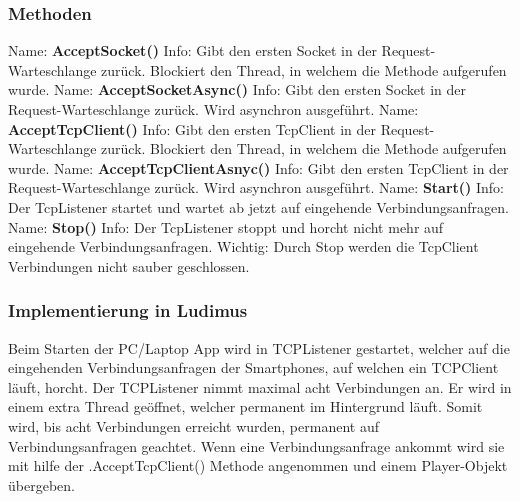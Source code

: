 \subsubsection{Methoden}
Name: \textbf{AcceptSocket()}
\newline
Info: Gibt den ersten Socket in der Request-Warteschlange zurück. Blockiert den Thread, in welchem die Methode aufgerufen wurde.
\newline \newline
Name: \textbf{AcceptSocketAsync()}
\newline
Info: Gibt den ersten Socket in der Request-Warteschlange zurück. Wird asynchron ausgeführt.
\newline \newline
Name: \textbf{AcceptTcpClient()}
\newline
Info: Gibt den ersten TcpClient in der Request-Warteschlange zurück. Blockiert den Thread, in welchem die Methode aufgerufen wurde.
\newline \newline
Name: \textbf{AcceptTcpClientAsnyc()}
\newline
Info: Gibt den ersten TcpClient in der Request-Warteschlange zurück. Wird asynchron ausgeführt.
\newline \newline
Name: \textbf{Start()}
\newline
Info: Der TcpListener startet und wartet ab jetzt auf eingehende Verbindungsanfragen.
\newline \newline
Name: \textbf{Stop()}
\newline
Info: Der TcpListener stoppt und horcht nicht mehr auf eingehende Verbindungsanfragen. Wichtig: Durch Stop werden die TcpClient Verbindungen nicht sauber geschlossen.
\newline \newline
\subsubsection{Implementierung in Ludimus}
Beim Starten der PC/Laptop App wird in TCPListener gestartet, welcher auf die eingehenden Verbindungsanfragen der Smartphones, auf welchen ein TCPClient läuft, horcht. Der TCPListener nimmt maximal acht Verbindungen an. Er wird in einem extra Thread geöffnet, welcher permanent im Hintergrund läuft. Somit wird, bis acht Verbindungen erreicht wurden, permanent auf Verbindungsanfragen geachtet. Wenn eine Verbindungsanfrage ankommt wird sie mit hilfe der .AcceptTcpClient() Methode angenommen und einem Player-Objekt übergeben.
